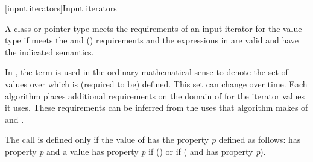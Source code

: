 [input.iterators]{Input iterators}

\pnum
A class or pointer type
meets the requirements of an input iterator for the value type
if
 meets the  and
 () requirements and
the expressions in  are valid and have
the indicated semantics.

\pnum
In , the term
is used in the ordinary mathematical sense to denote
the set of values over which
\tcode{==} is (required to be) defined.
This set can change over time.
Each algorithm places additional requirements on the domain of
\tcode{==} for the iterator values it uses.
These requirements can be inferred from the uses that algorithm
makes of \tcode{==} and \tcode{!=}.
\begin{example}
The call 
is defined only if the value of 
has the property \textit{p}
defined as follows:
 has property \textit{p}
and a value 
has property \textit{p}
if
()
or if
(
and
has property
\textit{p}).
\end{example}

